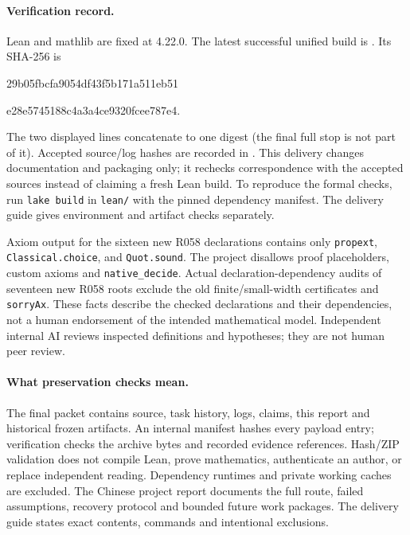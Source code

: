 \documentclass[11pt,a4paper]{article}
\begin{document}
\paragraph{Verification record.}
Lean and mathlib are fixed at 4.22.0. The latest successful unified build is
. Its SHA-256 is
\begin{center}\footnotesize\ttfamily
29b05fbcfa9054df43f5b171a511eb51\par
e28e5745188c4a3a4ce9320fcee787e4.
\end{center}
The two displayed lines concatenate to one digest (the final full stop is not
part of it). Accepted source/log hashes are recorded in
. This delivery changes documentation and
packaging only; it rechecks correspondence with the accepted sources instead
of claiming a fresh Lean build. To reproduce the formal checks, run
\texttt{lake build} in \texttt{lean/} with the pinned dependency manifest.
The delivery guide gives environment and artifact checks separately.

{\raggedright
Axiom output for the sixteen new R058 declarations contains only
\texttt{propext}, \texttt{Classical.choice}, and \texttt{Quot.sound}.
The project disallows proof placeholders, custom axioms and
\texttt{native\_decide}. Actual declaration-dependency audits of seventeen new R058 roots
exclude the old finite/small-width certificates and \texttt{sorryAx}.
These facts describe the checked declarations and their dependencies, not a
human endorsement of the intended mathematical model. Independent internal
AI reviews inspected definitions and hypotheses; they are not human peer review.\par}

\paragraph{What preservation checks mean.}
The final packet contains source, task history, logs, claims, this report and
historical frozen artifacts. An internal manifest hashes every payload entry;
verification checks the archive bytes and recorded evidence references.
Hash/ZIP validation does not compile Lean, prove mathematics, authenticate
an author, or replace independent reading. Dependency runtimes and private
working caches are excluded. The Chinese project report documents the full
route, failed assumptions, recovery protocol and bounded future work packages.
The delivery guide states exact contents, commands and intentional exclusions.
\end{document}
